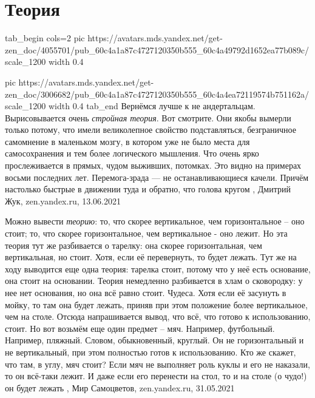  
 
 
 
 
\chapter{Теория}

\ifcmt
tab_begin cols=2
  pic https://avatars.mds.yandex.net/get-zen_doc/4055701/pub_60c4a1a87c4727120350b555_60c4a49792d1652ea77b089c/scale_1200
	width 0.4

	pic https://avatars.mds.yandex.net/get-zen_doc/3006682/pub_60c4a1a87c4727120350b555_60c4a4ea72119574b751162a/scale_1200
	width 0.4
tab_end
\fi
Вернёмся лучше к не андертальцам. Вырисовывается очень \emph{стройная теория}.
Вот смотрите. Они якобы вымерли только потому, что имели великолепное свойство
подставляться, безграничное самомнение в маленьком мозгу, в котором уже не было
места для самосохранения и тем более логического мышления. Что очень ярко
прослеживается в прямых, чудом выживших, потомках. Это видно на примерах восьми
последних лет. Перемога-зрада — не останавливающиеся качели. Причём настолько
быстрые в движении туда и обратно, что голова кругом
, 
Дмитрий Жук, zen.yandex.ru, 13.06.2021 

Можно вывести \emph{теорию}: то, что скорее вертикальное, чем горизонтальное –
оно стоит; то, что скорее горизонтальное, чем вертикальное - оно лежит. Но эта
теория тут же разбивается о тарелку: она скорее горизонтальная, чем
вертикальная, но стоит. Хотя, если её перевернуть, то будет лежать.  Тут же на
ходу выводится еще одна теория: тарелка стоит, потому что у неё есть основание,
она стоит на основании. Теория немедленно разбивается в хлам о сковородку: у
нее нет основания, но она всё равно стоит. Чудеса.  Хотя если её засунуть в
мойку, то там она будет лежать, приняв при этом положение более вертикальное,
чем на столе. Отсюда напрашивается вывод, что всё, что готово к использованию,
стоит.  Но вот возьмём еще один предмет – мяч. Например, футбольный. Например,
пляжный.  Словом, обыкновенный, круглый. Он не горизонтальный и не
вертикальный, при этом полностью готов к использованию. Кто же скажет, что там,
в углу, мяч стоит?  Если мяч не выполняет роль куклы и его не наказали, то он
всё-таки лежит. И даже если его перенести на стол, то и на столе (о чудо!) он
будет лежать
, Мир Самоцветов, zen.yandex.ru, 31.05.2021

